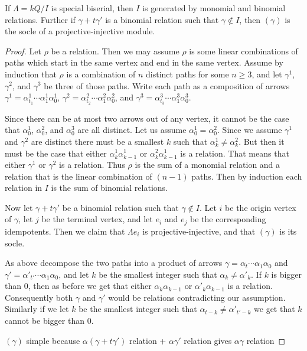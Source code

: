 \begin{prop}
	If $\Lambda = kQ/I$ is special biserial, then $I$ is generated by monomial and binomial relations. Further if $\gamma + t\gamma'$ is a binomial relation such that $\gamma \not\in I$, then $(\gamma)$ is the socle of a projective-injective module.
	\begin{proof}
		Let $\rho$ be a relation. Then we may assume $\rho$ is some linear combinations of paths which start in the same vertex and end in the same vertex. Assume by induction that $\rho$ is a combination of $n$ distinct paths for some $n\geq 3$, and let $\gamma^1$, $\gamma^2$, and $\gamma^3$ be three of those paths. Write each path as a composition of arrows $\gamma^1 = \alpha^1_{t_1} \cdots \alpha^1_1\alpha^1_0$,  $\gamma^2 = \alpha^2_{t_2} \cdots \alpha^2_1\alpha^2_0$, and  $\gamma^3 = \alpha^3_{t_3} \cdots \alpha^3_1\alpha^3_0$.
		
		Since there can be at most two arrows out of any vertex, it cannot be the case that $\alpha^1_0$, $\alpha^2_0$, and $\alpha^3_0$ are all distinct. Let us assume $\alpha^1_0 = \alpha^2_0$. Since we assume $\gamma^1$ and $\gamma^2$ are distinct there must be a smallest $k$ such that $\alpha^1_k \neq \alpha^2_k$. But then it must be the case that either $\alpha^1_k\alpha^1_{k-1}$ or $\alpha^2_k\alpha^1_{k-1}$ is a relation. That means that either $\gamma^1$ or $\gamma^2$ is a relation. Thus $\rho$ is the sum of a monomial relation and a relation that is the linear combination of $(n-1)$ paths. Then by induction each relation in $I$ is the sum of binomial relations.
		
		Now let $\gamma + t\gamma'$ be a binomial relation such that $\gamma \not\in I$. Let $i$ be the origin vertex of $\gamma$, let $j$ be the terminal vertex, and let $e_i$ and $e_j$ be the corresponding idempotents. Then we claim that $\Lambda e_i$ is projective-injective, and that $(\gamma)$ is its socle.
		
		As above decompose the two paths into a product of arrows $\gamma = \alpha_{t}\cdots \alpha_1\alpha_0$ and $\gamma' = \alpha'_{t'}\cdots \alpha_1\alpha_0$, and let $k$ be the smallest integer such that $\alpha_k \neq \alpha'_k$. If $k$ is bigger than 0, then as before we get that either $\alpha_k\alpha_{k-1}$ or $\alpha'_k\alpha_{k-1}$ is a relation. Consequently both $\gamma$ and $\gamma'$ would be relations contradicting our assumption. Similarly if we let $k$ be the smallest integer such that $\alpha_{t-k} \neq \alpha'_{t'-k}$ we get that $k$ cannot be bigger than 0. 
		
		$(\gamma)$ simple because $\alpha(\gamma + t\gamma')$ relation + $\alpha\gamma'$ relation gives $\alpha\gamma$ relation
		
		 
	\end{proof} 
\end{prop}

